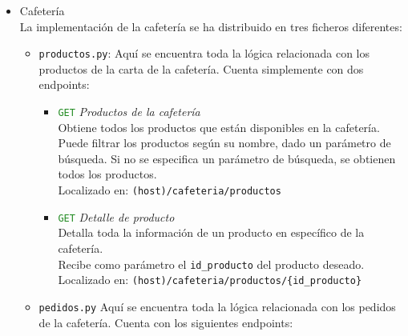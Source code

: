 \documentclass[12pt]{report}
\begin{document}
\begin{itemize}
\begin{itemize}
    \item \textcolor{YellowOrange}{\texttt{POST}} \textit{Insertar histórico}\\
    Tras haber finalizado el proceso de atemperamiento de un aula, el Arduino llamará a este endpoint para anotar la temperatura a la que estaba el aula antes de intervenir, y anotará también el tiempo empleado en adecuar la temperatura. Estos datos serán útiles de cara a mejorar las estimaciones inteligentes explicadas en el endpoint anterior.\\
    Localizado en: \texttt{(host)/aulas/historico}
            \\Ejemplo de cuerpo de la solicitud:
        \begin{verbatim}
      {
          "id_aula_aula":1,
          "temperatura_previa":21,
          "tiempo_calentar":12
      }
        \end{verbatim}
\end{itemize}

    \item Cafetería\\
La implementación de la cafetería se ha distribuido en tres ficheros diferentes:
\begin{itemize}
\item \texttt{productos.py}:
Aquí se encuentra toda la lógica relacionada con los productos de la carta de la cafetería. Cuenta simplemente con dos endpoints:
\begin{itemize}
    \item \textcolor{ForestGreen}{\texttt{GET}} \textit{Productos de la cafetería}\\
    Obtiene todos los productos que están disponibles en la cafetería. Puede filtrar los productos según su nombre, dado un parámetro de búsqueda. Si no se especifica un parámetro de búsqueda, se obtienen todos los productos.\\
    Localizado en: \texttt{(host)/cafeteria/productos}
    \item \textcolor{ForestGreen}{\texttt{GET}} \textit{Detalle de producto}\\
    Detalla toda la información de un producto en específico de la cafetería.\\
    Recibe como parámetro el \texttt{id\_producto} del producto deseado.\\
    Localizado en: \texttt{(host)/cafeteria/productos/\{id\_producto\}}
\end{itemize}

    
    \item \texttt{pedidos.py}
    Aquí se encuentra toda la lógica relacionada con los pedidos de la cafetería. Cuenta con los siguientes endpoints:
    \begin{itemize}


\end{itemize}
\end{itemize}
\end{itemize}
\end{document}
